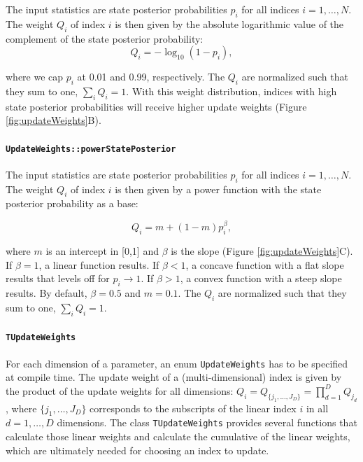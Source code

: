 \documentclass[a4paper,11pt]{article}
\newcommand{\class}[1]{\texttt{#1}}
\newcommand{\enum}[1]{\texttt{#1}}
\begin{document}
The input statistics are state posterior probabilities $p_i$ for all indices $i = 1, \ldots, N$. The weight $Q_i$ of index $i$ is then given by the absolute logarithmic value of the complement of the state posterior probability:
\begin{equation*}
 Q_i = -\log_{10}(1-p_i),
\end{equation*}

where we cap $p_i$ at 0.01 and 0.99, respectively. The $Q_i$ are normalized such that they sum to one, $\sum_i Q_i = 1$. With this weight distribution, indices with high state posterior probabilities will receive higher update weights (Figure \ref{fig:updateWeights}B).

\paragraph{\enum{UpdateWeights::powerStatePosterior}}

The input statistics are state posterior probabilities $p_i$ for all indices $i = 1, \ldots, N$. The weight $Q_i$ of index $i$ is then given by a power function with the state posterior probability as a base:

\begin{equation*}
 Q_i = m + (1-m) p_i^\beta,
\end{equation*}

where $m$ is an intercept in [0,1] and $\beta$ is the slope (Figure \ref{fig:updateWeights}C). If $\beta = 1$, a linear function results. If $\beta < 1$, a concave function with a flat slope results that levels off for $p_i \to 1$. If $\beta > 1$, a convex function with a steep slope results. By default, $\beta = 0.5$ and $m = 0.1$. The $Q_i$ are normalized such that they sum to one, $\sum_i Q_i = 1$.

\paragraph{\class{TUpdateWeights}}

For each dimension of a parameter, an enum \enum{UpdateWeights} has to be specified at compile time. The update weight of a (multi-dimensional) index is given by the product of the update weights for all dimensions: $Q_i = Q_{\{j_1, \ldots, J_D\}} = \prod_{d=1}^D Q_{j_d}$, where $\{j_1, \ldots, J_D\}$ corresponds to the subscripts of the linear index $i$ in all $d=1, \ldots, D$ dimensions. The class \class{TUpdateWeights} provides several functions that calculate those linear weights and calculate the cumulative of the linear weights, which are ultimately needed for choosing an index to update.
\end{document}
